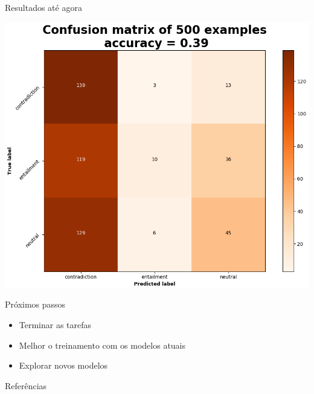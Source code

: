 \documentclass[10pt]{beamer}
\begin{document}
\begin{frame}{Resultados até agora}
\begin{center}
\includegraphics[scale=0.42]{images/cm_mem_EntailQA2.png}
\end{center}
\end{frame}


\begin{frame}{Próximos passos}
\begin{itemize}

\item Terminar as tarefas

\item Melhor o treinamento com os modelos atuais

\item Explorar novos modelos
\end{itemize}


\end{frame}

\begin{frame}[allowframebreaks]{Referências}

  
  

\end{frame}
\end{document}
